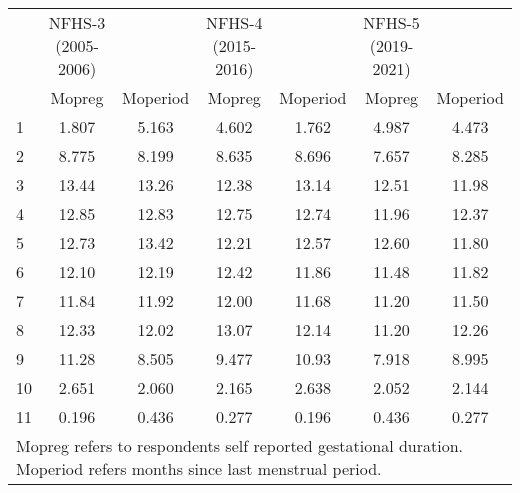 \begin{tabular}{l*{6}{c}}
\toprule
            &NFHS-3 (2005-2006)&            &NFHS-4 (2015-2016)&            &NFHS-5 (2019-2021)&            \\
            &\multicolumn{1}{c}{Mopreg}&\multicolumn{1}{c}{Moperiod}&\multicolumn{1}{c}{Mopreg}&\multicolumn{1}{c}{Moperiod}&\multicolumn{1}{c}{Mopreg}&\multicolumn{1}{c}{Moperiod}\\
\midrule
\midrule
1           &       1.807&       5.163&       4.602&       1.762&       4.987&       4.473\\
2           &       8.775&       8.199&       8.635&       8.696&       7.657&       8.285\\
3           &       13.44&       13.26&       12.38&       13.14&       12.51&       11.98\\
4           &       12.85&       12.83&       12.75&       12.74&       11.96&       12.37\\
5           &       12.73&       13.42&       12.21&       12.57&       12.60&       11.80\\
6           &       12.10&       12.19&       12.42&       11.86&       11.48&       11.82\\
7           &       11.84&       11.92&       12.00&       11.68&       11.20&       11.50\\
8           &       12.33&       12.02&       13.07&       12.14&       11.20&       12.26\\
9           &       11.28&       8.505&       9.477&       10.93&       7.918&       8.995\\
10          &       2.651&       2.060&       2.165&       2.638&       2.052&       2.144\\
11          &       0.196&       0.436&       0.277&       0.196&       0.436&       0.277\\
\bottomrule
\multicolumn{7}{l}{\footnotesize Mopreg refers to respondents self reported gestational duration. Moperiod refers months since last menstrual period.}\\
\end{tabular}
